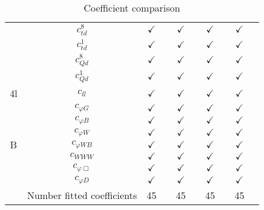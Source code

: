 \documentclass{article}
\begin{document}
\begin{table}[H]
\begin{tabular}{|c|c|c|c|c|c|c|c|c|c|}
 & $c_{td}^{8}$ & $\checkmark$ &  & $\checkmark$ &  & $\checkmark$ &  & $\checkmark$ & \\ \cline{2-10}
 & $c_{td}^{1}$ & $\checkmark$ &  & $\checkmark$ &  & $\checkmark$ &  & $\checkmark$ & \\ \cline{2-10}
 & $c_{Qd}^{8}$ & $\checkmark$ &  & $\checkmark$ &  & $\checkmark$ &  & $\checkmark$ & \\ \cline{2-10}
 & $c_{Qd}^{1}$ & $\checkmark$ &  & $\checkmark$ &  & $\checkmark$ &  & $\checkmark$ & 
\\ \hline
\multirow{1}{*}{4l}
 & $c_{ll}$ & $\checkmark$ &  & $\checkmark$ &  & $\checkmark$ &  & $\checkmark$ & 
\\ \hline
\multirow{7}{*}{B}
 & $c_{\varphi G}$ & $\checkmark$ &  & $\checkmark$ &  & $\checkmark$ &  & $\checkmark$ & \\ \cline{2-10}
 & $c_{\varphi B}$ & $\checkmark$ &  & $\checkmark$ &  & $\checkmark$ &  & $\checkmark$ & \\ \cline{2-10}
 & $c_{\varphi W}$ & $\checkmark$ &  & $\checkmark$ &  & $\checkmark$ &  & $\checkmark$ & \\ \cline{2-10}
 & $c_{\varphi WB}$ & $\checkmark$ &  & $\checkmark$ &  & $\checkmark$ &  & $\checkmark$ & \\ \cline{2-10}
 & $c_{WWW}$ & $\checkmark$ &  & $\checkmark$ &  & $\checkmark$ &  & $\checkmark$ & \\ \cline{2-10}
 & $c_{\varphi \Box}$ & $\checkmark$ &  & $\checkmark$ &  & $\checkmark$ &  & $\checkmark$ & \\ \cline{2-10}
 & $c_{\varphi D}$ & $\checkmark$ &  & $\checkmark$ &  & $\checkmark$ &  & $\checkmark$ & 
\\ \hline
\hline & Number fitted coefficients & 45 &  & 45 &  & 45 &  & 45 &  \\ \hline
\end{tabular}
\caption{Coefficient comparison}
\end{table}
\end{document}
